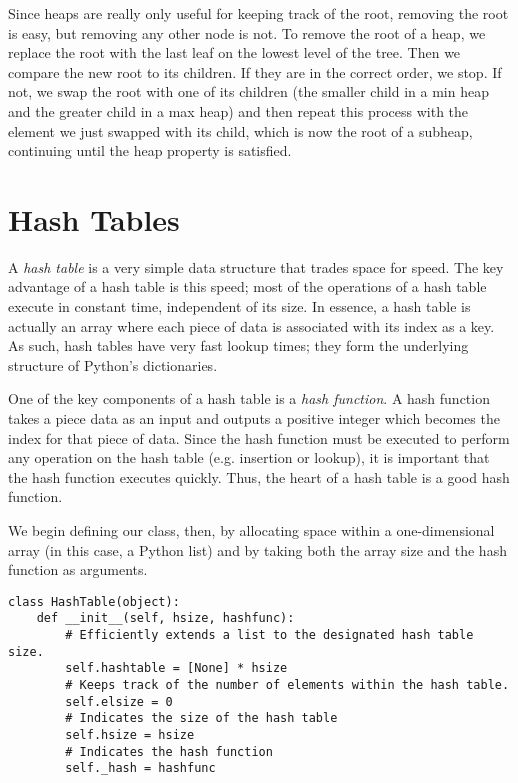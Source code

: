 Since heaps are really only useful for keeping track of the root, removing the root is easy, but removing any other node is not.
To remove the root of a heap, we replace the root with the last leaf on the lowest level of the tree. Then we compare the new root to its children. If they are in the correct order, we stop. If not, we swap the root with one of its children (the smaller child in a  min heap and the greater child in a max heap) and then repeat this process with the element we just swapped with its child, which is now the root of a subheap, continuing until the heap property is satisfied.

\section*{Hash Tables}
A \emph{hash table} is a very simple data structure that trades space for speed.
The key advantage of a hash table is this speed; most of the operations of a hash table execute in constant time, independent of its size.
In essence, a hash table is actually an array where each piece of data is associated with its index as a key.
As such, hash tables have very fast lookup times; they form the underlying structure of Python's dictionaries.

One of the key components of a hash table is a \emph{hash function}.
A hash function takes a piece data as an input and outputs a positive integer which becomes the index for that piece of data.
Since the hash function must be executed to perform any operation on the hash table (e.g. insertion or lookup), it is important that the hash function executes quickly.
Thus, the heart of a hash table is a good hash function.

We begin defining our  class, then, by allocating space within a one-dimensional array (in this case, a Python list) and by taking both the array size and the hash function as arguments.
\begin{lstlisting}
class HashTable(object):
    def __init__(self, hsize, hashfunc):
        # Efficiently extends a list to the designated hash table size.
        self.hashtable = [None] * hsize
        # Keeps track of the number of elements within the hash table.
        self.elsize = 0
        # Indicates the size of the hash table
        self.hsize = hsize
        # Indicates the hash function
        self._hash = hashfunc
\end{lstlisting}

